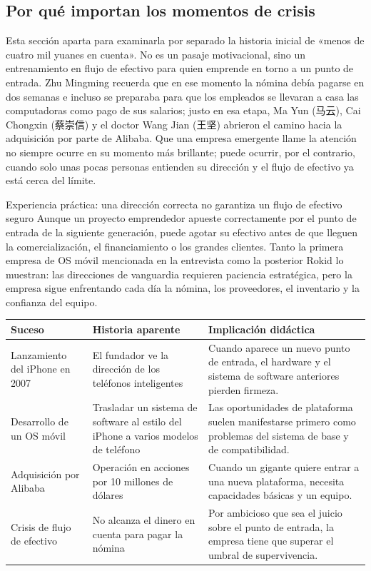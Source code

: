 \subsection{Por qué importan los momentos de crisis}

Esta sección aparta para examinarla por separado la historia inicial de «menos de cuatro mil yuanes en cuenta». No es un pasaje motivacional, sino un entrenamiento en flujo de efectivo para quien emprende en torno a un punto de entrada. Zhu Mingming recuerda que en ese momento la nómina debía pagarse en dos semanas e incluso se preparaba para que los empleados se llevaran a casa las computadoras como pago de sus salarios; justo en esa etapa, Ma Yun (马云), Cai Chongxin (蔡崇信) y el doctor Wang Jian (王坚) abrieron el camino hacia la adquisición por parte de Alibaba. Que una empresa emergente llame la atención no siempre ocurre en su momento más brillante; puede ocurrir, por el contrario, cuando solo unas pocas personas entienden su dirección y el flujo de efectivo ya está cerca del límite.

\begin{warningbox}{Experiencia práctica: una dirección correcta no garantiza un flujo de efectivo seguro}
Aunque un proyecto emprendedor apueste correctamente por el punto de entrada de la siguiente generación, puede agotar su efectivo antes de que lleguen la comercialización, el financiamiento o los grandes clientes. Tanto la primera empresa de OS móvil mencionada en la entrevista como la posterior Rokid lo muestran: las direcciones de vanguardia requieren paciencia estratégica, pero la empresa sigue enfrentando cada día la nómina, los proveedores, el inventario y la confianza del equipo.
\end{warningbox}

\noindent\begin{tabularx}{\textwidth}{p{}p{}X}
\toprule
Suceso & Historia aparente & Implicación didáctica \\
\midrule
Lanzamiento del iPhone en 2007 & El fundador ve la dirección de los teléfonos inteligentes & Cuando aparece un nuevo punto de entrada, el hardware y el sistema de software anteriores pierden firmeza. \\
Desarrollo de un OS móvil & Trasladar un sistema de software al estilo del iPhone a varios modelos de teléfono & Las oportunidades de plataforma suelen manifestarse primero como problemas del sistema de base y de compatibilidad. \\
Adquisición por Alibaba & Operación en acciones por 10 millones de dólares & Cuando un gigante quiere entrar a una nueva plataforma, necesita capacidades básicas y un equipo. \\
Crisis de flujo de efectivo & No alcanza el dinero en cuenta para pagar la nómina & Por ambicioso que sea el juicio sobre el punto de entrada, la empresa tiene que superar el umbral de supervivencia. \\
\bottomrule
\end{tabularx}

